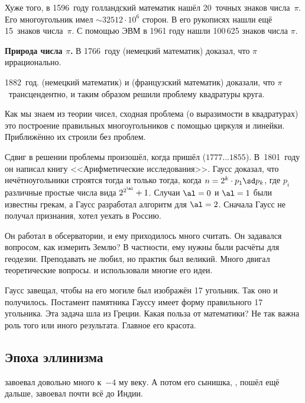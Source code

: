 \documentclass[a4paper,oneside,fleqn,10pt]{article}
\newcommand{\pe}[2]{${#1}\ldots{#2}$}
\begin{document}
Хуже того, в 1596~году голландский математик  нашёл 20~точных знаков числа~$\pi$.
Его многоугольник имел $\sim32512\cdot 10^6$ сторон. В его рукописях нашли ещё 15~знаков числа~$\pi$.
С помощью ЭВМ в 1961 году нашли 100\,625 знаков числа $\pi$.

\textbf{Природа числа $\pi$.}
В 1766~году  (немецкий математик) доказал, что $\pi$ иррационально.

1882~год.  (немецкий математик) и 
(французский математик) доказали, что $\pi$~трансцендентно,
и таким образом решили проблему квадратуры круга.

Как мы знаем из теории чисел, сходная проблема (о выразимости в квадратурах) это построение
правильных многоугольников с помощью циркуля и линейки.
Приближённо их строили без проблем.

Сдвиг в решении проблемы произошёл, когда пришёл  (\pe{1777}{1855}).
В~1801~году он написал книгу <<Арифметические исследования>>.
Гаусс доказал, что нечётноугольники строятся тогда и только тогда, когда
$n = 2^k \cdot p_1 \sd p_k$, где $p_i$ различные простые числа вида $2^{2^\al} +1$.
Случаи $\al = 0$ и $\al = 1$ были известны грекам,
а Гаусс разработал алгоритм для $\al = 2$.
Сначала Гаусс не получал признания, хотел уехать в Россию.

Он работал в обсерватории, и ему приходилось много считать. Он задавался вопросом, как измерить Землю?
В частности, ему нужны были расчёты для геодезии. Преподавать не любил, но практик был великий.
Много двигал теоретические вопросы.  и  использовали многие его идеи.

Гаусс завещал, чтобы на его могиле был изображён 17 угольник.
Так оно и получилось. Постамент памятника Гауссу  имеет
форму правильного 17 угольника.
Эта  задача шла из Греции. Какая польза от математики?
Не так важна роль того или иного результата. Главное его красота.


\subsection{Эпоха эллинизма}

 завоевал довольно много к~$-4$ му веку. А потом
его сынишка, , пошёл ещё дальше, завоевал почти всё до Индии.
\end{document}
